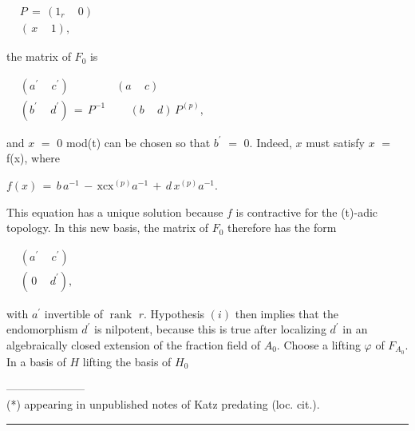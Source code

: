 \documentclass[9pt]{article}
\newcommand{\CanonText}[1]{\par{\fontsize{8.0}{9.35}\selectfont\RaggedRight #1\par}\vspace{2.2pt}}
\newcommand{\CanonDisplay}[1]{\par\vspace{1.2pt}\begin{center}{\fontsize{7.2}{8.4}\selectfont\(\displaystyle #1\)}\end{center}\vspace{1.2pt}}
\newenvironment{CanonMathBlock}{\par\vspace{1.2pt}\begin{center}\fontsize{6.8}{8.0}\selectfont\(\displaystyle}{\)\end{center}\vspace{1.2pt}}
\begin{document}
\begin{minipage}[t][\dimexpr\textheight-5pt\relax][t]{\textwidth}
\begin{CanonMathBlock}
\begin{aligned}
& P\,=\,(1_{r}\quad\,0)\\
& (\,x\quad\,1),
\end{aligned}
\end{CanonMathBlock}
\CanonText{the matrix of \(F_{0}\) is}
\begin{CanonMathBlock}
\begin{aligned}
& (a^{\prime}\quad\,c^{\prime})\qquad\qquad\,(a\quad\,c)\\
& (b^{\prime}\quad\,d^{\prime})\,=\,P^{-1}\qquad\,(b\quad\,d)\,P^{(p)},
\end{aligned}
\end{CanonMathBlock}
\CanonText{and \(x\) \(=\) 0 mod(t) can be chosen so that \(b^{\prime}\) \(=\) 0. Indeed, \(x\) must satisfy \(x\) \(=\) f(x), where}
\CanonDisplay{f(x)\,=\,b\,a^{-1}\,-\,\text{xcx}^{(p)}a^{-1}\,+\,d\,x^{(p)}a^{-1}.}
\CanonText{This equation has a unique solution because \(f\) is contractive for the (t)-adic topology. In this new basis, the matrix of \(F_{0}\) therefore has the form}
\begin{CanonMathBlock}
\begin{aligned}
& (a^{\prime}\quad\,c^{\prime})\\
& (\,0\quad\,d^{\prime}),
\end{aligned}
\end{CanonMathBlock}
\CanonText{with \(a^{\prime}\) invertible of \(\operatorname{rank}\) \(r\). Hypothesis \((i)\) then implies that the endomorphism \(d^{\prime}\) is nilpotent, because this is true after localizing \(d^{\prime}\) in an algebraically closed extension of the fraction field of \(A_{0}\). Choose a lifting \(\varphi{}\) of \(F_{A_{0}}\). In a basis of \(H\) lifting the basis of \(H_{0}\)}
\CanonText{---------------------\\(*) appearing in unpublished notes of Katz predating (loc. cit.).}
\vfill
{\color{Accent}\hrule height 0.35pt}\vspace{3pt}
\end{minipage}
\newpage
\end{document}
